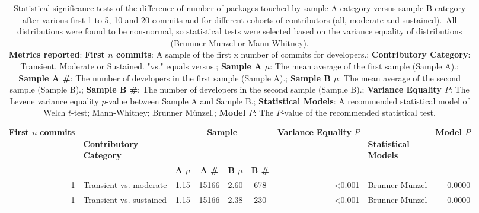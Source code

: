 \begin{table}[H]
\centering
\setlength{\tabcolsep}{2pt}
\caption[Statistical Significance Normality and Variance tests for packages for  sample A category versus sample B category  for 1 to 5, 10 and 20]{Statistical significance tests of the difference of number of packages touched by  sample A category versus sample B category  after various first 1 to 5, 10 and 20 commits and for different cohorts of contributors (all, moderate and sustained). All distributions were found to be non-normal, so statistical tests were selected based on the variance equality of distributions (Brumner-Munzel or Mann-Whitney). \\ \textbf{Metrics reported}:   \textbf{First $n$ commits}: A sample of the first x number of commits for developers.;  \textbf{Contributory Category}: Transient, Moderate or Sustained. "vs." equals versus.;  \textbf{Sample A $\mu$}: The mean average of the first sample (Sample A).;  \textbf{Sample A \#}: The number of developers in the first sample (Sample A).;  \textbf{Sample B $\mu$}: The mean average of the second sample (Sample B).;  \textbf{Sample B \#}: The number of developers in the second sample (Sample B).;  \textbf{Variance Equality $P$}: The Levene variance equality $p$-value between Sample A and Sample B.;  \textbf{Statistical Models}: A recommended statistical model of Welch $t$-test; Mann-Whitney; Brunner Münzel.;  \textbf{Model $P$}: The $P$-value of the recommended statistical test.
}
\begin{tabular}{r p{4cm} c c c c r l r}
\toprule
\makecell[t]{\textbf{First $n$}\\\textbf{commits}} & \makecell[t]{\textbf{}\\\textbf{Contributory}\\\textbf{Category}} & \multicolumn{4}{c}{\textbf{Sample}} & \makecell[t]{\textbf{Variance}\\\textbf{Equality}\\\textbf{$P$}} & \makecell[t]{\textbf{}\\\textbf{Statistical}\\\textbf{Models}} & \textbf{Model $P$} \\ 
\cmidrule(lr){3-6}
 &  & \textbf{A $\mu$} & \textbf{A \#} & \textbf{B $\mu$} & \textbf{B \#} &  &  &  \\ 
\midrule
1 & Transient vs. moderate &  1.15 & 15166 & 2.60 & 678 & \textless 0.001 &  Brunner-Münzel & 0.0000 \\ 
1 & Transient vs. sustained &  1.15 & 15166 & 2.38 & 230 & \textless 0.001 &  Brunner-Münzel & 0.0000 \\ 

\end{tabular}
\end{table}
